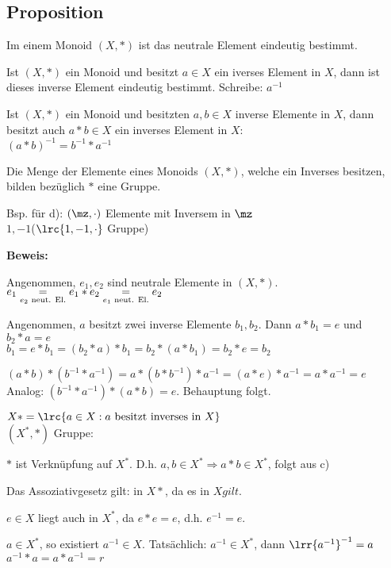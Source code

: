 	\subsection{Proposition}
	
		\item Im einem Monoid $(X,*)$ ist das neutrale Element eindeutig bestimmt.
		\item Ist $(X,*)$ ein Monoid und besitzt $a\in X$ ein iverses Element in $X$, dann ist dieses inverse Element eindeutig bestimmt. Schreibe: $a^{-1}$
		\item Ist $(X,*)$ ein Monoid und besitzten $a,b\in X$ inverse Elemente in $X$, dann besitzt auch $a*b\in X$ ein inverses Element in $X$:\\
		$(a*b)^{-1}=b^{-1}*a^{-1}$
		\item Die Menge der Elemente eines Monoids $(X,*)$, welche ein Inverses besitzen, bilden bezüglich $*$ eine Gruppe.
	\subExEnd
	
	Bsp. für d): $(\mz,\cdot)$ Elemente mit Inversem in $\mz$\\
	$1,-1$\quad ($\lrc{1,-1,\cdot}$ Gruppe)
	
	\textbf{Beweis:}
		\item Angenommen, $e_1,e_2$ sind neutrale Elemente in $(X,*)$.$e_1\underset{e_2\mbox{\scriptsize\ neut. El.}}{=}e_1*e_2\underset{e_1\mbox{\scriptsize\ neut. El.}}=e_2$
		\item Angenommen, $a$ besitzt zwei inverse Elemente $b_1, b_2$. Dann $a*b_1=e$ und $b_2*a=e$\\
		$b_1=e*b_1=(b_2*a)*b_1=b_2*(a*b_1)=b_2*e=b_2$
		\item $(a*b)*(b^{-1}*a^{-1})=a*(b*b^{-1})*a^{-1}=(a*e)*a^{-1}=a*a^{-1}=e$\\
		Analog: $(b^{-1}*a^{-1})*(a*b)=e$. Behauptung folgt.
		\item $X*=\lrc{a\in X: a\mbox{ besitzt inverses in }X}$\\
		$(X^*,*)$ Gruppe:
			\item $*$ ist Verknüpfung auf $X^*$. D.h. $a,b\in X^*\Rightarrow a*b\in X^*$, folgt aus c)
			\item Das Assoziativgesetz gilt: in $X*$, da es in $X gilt$.
			\item $e\in X$ liegt auch in $X^*$, da $e*e=e$, d.h. $e^{-1}=e$.
			\item $a\in X^*$, so existiert $a^{-1}\in X$. Tatsächlich: $a^{-1}\in X^*$, dann $\lrr{a^{-1}}^{-1}=a$\\
			$a^{-1}*a=a*a^{-1}=r$
		\subExEnd
	\subExEnd
	
